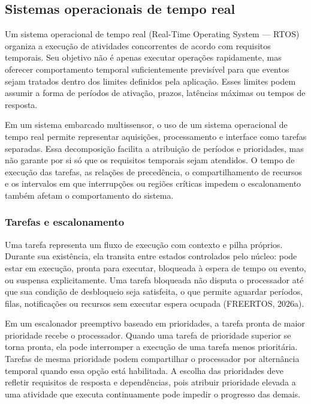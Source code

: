 \documentclass{article}
\begin{document}
\subsection{Sistemas operacionais de tempo real}


Um sistema operacional de tempo real (Real-Time Operating System --- RTOS) organiza a execu\c{c}\~ao de atividades concorrentes de acordo com requisitos temporais. Seu objetivo n\~ao \'e apenas executar opera\c{c}\~oes rapidamente, mas oferecer comportamento temporal suficientemente previs\'ivel para que eventos sejam tratados dentro dos limites definidos pela aplica\c{c}\~ao. Esses limites podem assumir a forma de per\'iodos de ativa\c{c}\~ao, prazos, lat\^encias m\'aximas ou tempos de resposta.


Em um sistema embarcado multissensor, o uso de um sistema operacional de tempo real permite representar aquisi\c{c}\~oes, processamento e interface como tarefas separadas. Essa decomposi\c{c}\~ao facilita a atribui\c{c}\~ao de per\'iodos e prioridades, mas n\~ao garante por si s\'o que os requisitos temporais sejam atendidos. O tempo de execu\c{c}\~ao das tarefas, as rela\c{c}\~oes de preced\^encia, o compartilhamento de recursos e os intervalos em que interrup\c{c}\~oes ou regi\~oes cr\'iticas impedem o escalonamento tamb\'em afetam o comportamento do sistema.


\subsubsection{Tarefas e escalonamento}


Uma tarefa representa um fluxo de execu\c{c}\~ao com contexto e pilha pr\'oprios. Durante sua exist\^encia, ela transita entre estados controlados pelo n\'ucleo: pode estar em execu\c{c}\~ao, pronta para executar, bloqueada \`a espera de tempo ou evento, ou suspensa explicitamente. Uma tarefa bloqueada n\~ao disputa o processador at\'e que sua condi\c{c}\~ao de desbloqueio seja satisfeita, o que permite aguardar per\'iodos, filas, notifica\c{c}\~oes ou recursos sem executar espera ocupada (FREERTOS, 2026a).


Em um escalonador preemptivo baseado em prioridades, a tarefa pronta de maior prioridade recebe o processador. Quando uma tarefa de prioridade superior se torna pronta, ela pode interromper a execu\c{c}\~ao de uma tarefa menos priorit\'aria. Tarefas de mesma prioridade podem compartilhar o processador por altern\^ancia temporal quando essa op\c{c}\~ao est\'a habilitada. A escolha das prioridades deve refletir requisitos de resposta e depend\^encias, pois atribuir prioridade elevada a uma atividade que executa continuamente pode impedir o progresso das demais.
\end{document}
